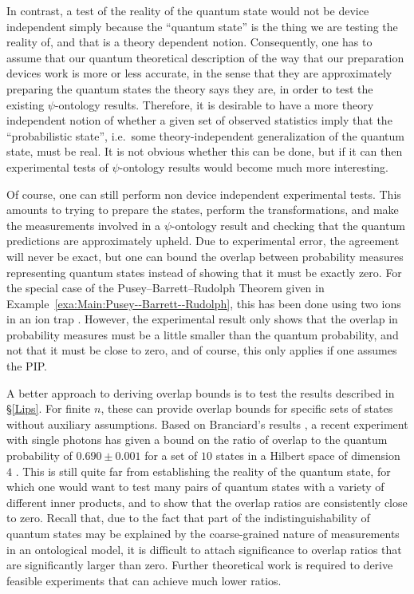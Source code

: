 \documentclass[DIV=calc,paper=a4,fontsize=11pt,twocolumn]{scrartcl} %
\theoremstyle{definition}
\theoremstyle{plain}
\begin{document}
In contrast, a test of the reality of the quantum state would not be
device independent simply because the ``quantum state'' is the thing
we are testing the reality of, and that is a theory dependent notion.
Consequently, one has to assume that our quantum theoretical
description of the way that our preparation devices work is more or
less accurate, in the sense that they are approximately preparing the
quantum states the theory says they are, in order to test the existing
$\psi$-ontology results.  Therefore, it is desirable to have a more
theory independent notion of whether a given set of observed
statistics imply that the ``probabilistic state'', i.e.\ some
theory-independent generalization of the quantum state, must be real.
It is not obvious whether this can be done, but if it can then
experimental tests of $\psi$-ontology results would become much more
interesting.

Of course, one can still perform non device independent experimental
tests.  This amounts to trying to prepare the states, perform the
transformations, and make the measurements involved in a
$\psi$-ontology result and checking that the quantum predictions are
approximately upheld.  Due to experimental error, the agreement will
never be exact, but one can bound the overlap between probability
measures representing quantum states instead of showing that it must
be exactly zero.  For the special case of the Pusey--Barrett--Rudolph Theorem given in
Example~\ref{exa:Main:Pusey--Barrett--Rudolph}, this has been done using two ions in an
ion trap \cite{Nigg2012}.  However, the experimental result only shows
that the overlap in probability measures must be a little smaller than
the quantum probability, and not that it must be close to zero, and of
course, this only applies if one assumes the PIP.

A better approach to deriving overlap bounds is to test the results
described in \S\ref{Lips}.  For finite $n$, these can provide overlap
bounds for specific sets of states without auxiliary assumptions.
Based on Branciard's results \cite{Branciard2014}, a recent experiment
with single photons has given a bound on the ratio of overlap to the
quantum probability of $0.690 \pm 0.001$ for a set of $10$ states in a
Hilbert space of dimension $4$ \cite{Ringbauer2014}.  This is still
quite far from establishing the reality of the quantum state, for
which one would want to test many pairs of quantum states with a
variety of different inner products, and to show that the overlap
ratios are consistently close to zero.  Recall that, due to the fact
that part of the indistinguishability of quantum states may be
explained by the coarse-grained nature of measurements in an
ontological model, it is difficult to attach significance to overlap
ratios that are significantly larger than zero.  Further theoretical
work is required to derive feasible experiments that can achieve much
lower ratios.
\end{document}
